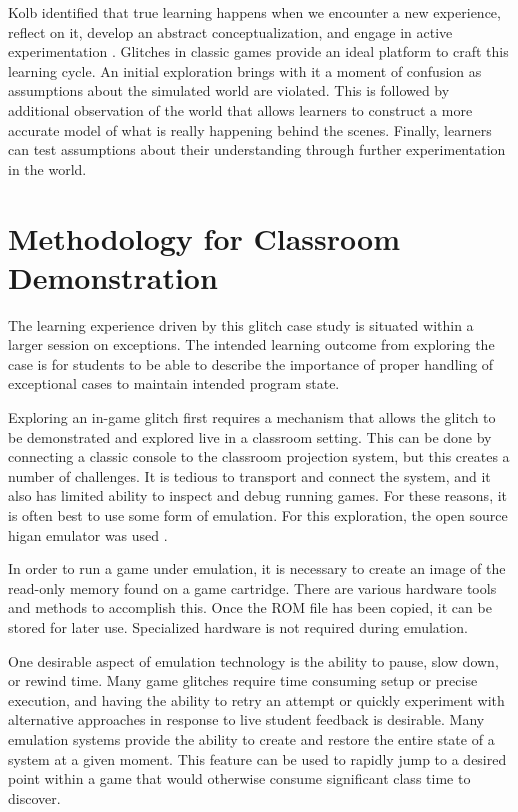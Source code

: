 \documentclass[letterpaper]{article}
\begin{document}
Kolb identified that true learning happens when we encounter a new experience, reflect on it, develop an abstract conceptualization, and engage in active experimentation \cite{kolb84}. Glitches in classic games provide an ideal platform to craft this learning cycle. An initial exploration brings with it a moment of confusion as assumptions about the simulated world are violated. This is followed by additional observation of the world that allows learners to construct a more accurate model of what is really happening behind the scenes. Finally, learners can test assumptions about their understanding through further experimentation in the world.

\section{Methodology for Classroom Demonstration}

The learning experience driven by this glitch case study is situated within a larger session on exceptions. The intended learning outcome from exploring the case is for students to be able to describe the importance of proper handling of exceptional cases to maintain intended program state.

Exploring an in-game glitch first requires a mechanism that allows the glitch to be demonstrated and explored live in a classroom setting. This can be done by connecting a classic console to the classroom projection system, but this creates a number of challenges. It is tedious to transport and connect the system, and it also has limited ability to inspect and debug running games. For these reasons, it is often best to use some form of emulation. For this exploration, the open source higan emulator was used \cite{ginder2004higan}.

In order to run a game under emulation, it is necessary to create an image of the read-only memory found on a game cartridge. There are various hardware tools and methods to accomplish this. Once the ROM file has been copied, it can be stored for later use. Specialized hardware is not required during emulation.

One desirable aspect of emulation technology is the ability to pause, slow down, or rewind time. Many game glitches require time consuming setup or precise execution, and having the ability to retry an attempt or quickly experiment with alternative approaches in response to live student feedback is desirable. Many emulation systems provide the ability to create and restore the entire state of a system at a given moment. This feature can be used to rapidly jump to a desired point within a game that would otherwise consume significant class time to discover.
\end{document}
